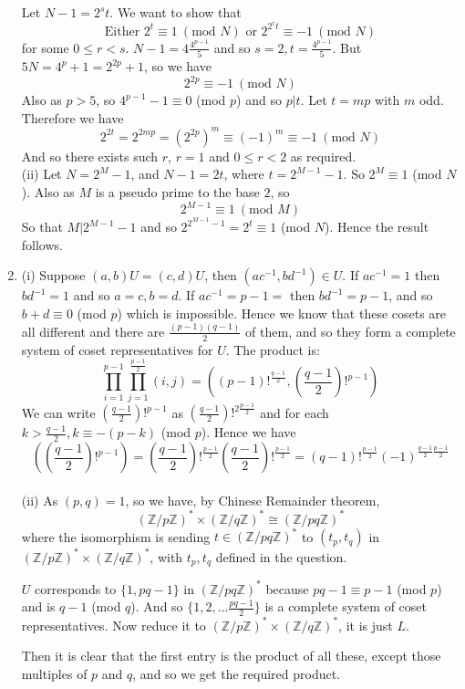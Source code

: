 \begin{enumerate}
    Let $N-1=2^s t$. We want to show that
    $$\text{Either } 2^t \equiv 1~(\text{mod } N) \text{ or } 2^{2^r t} \equiv -1~(\text{mod }N)$$
    for some $0 \le r <s$. $N-1=4 \frac{4^{p-1}}{5}$ and so $s = 2, t= \frac{4^{p-1}}{5}$.
    But $5N=4^p+1=2^{2p}+1$, so we have $$2^{2p} \equiv -1~(\text{mod }N)$$ Also as $p>5$, so
    $4^{p-1}-1 \equiv 0$ (mod $p$) and so $p|t$. Let $t=mp$ with $m$ odd.
    Therefore we have
    $$2^{2t}=2^{2mp}=(2^{2p})^{m} \equiv (-1)^m \equiv -1~(\text{mod } N)$$
    And so there exists such $r$, $r=1$ and $0 \le r < 2$ as required.\\
    (ii) Let $N=2^M-1$, and $N-1=2t$, where $t=2^{M-1}-1$. So $2^M \equiv 1$ (mod $N$).
    Also as $M$ is a pseudo prime to the base $2$, so
    $$2^{M-1} \equiv 1~(\text{mod } M)$$
    So that $M|2^{M-1}-1$ and so $2^{2^{M-1}-1}=2^t \equiv 1$ (mod $N$). Hence the result follows.
\item (i) Suppose $(a,b)U=(c,d)U$, then $(ac^{-1},bd^{-1}) \in U$. If $ac^{-1}=1$ then $bd^{-1}=1$ and so $a=c, b=d$. If $ac^{-1}=p-1=$ then $bd^{-1}=p-1$, and so $b+d \equiv 0$ (mod $p$) which is impossible. Hence we know that these cosets are all different and there are $\frac{(p-1)(q-1)}{2}$ of them, and so they form a complete system of coset representatives for $U$. The product is:
    $$\prod_{i=1}^{p-1} \prod_{j=1}^{\frac{p-1}{2}} (i,j)
    =\left((p-1)!^{\frac{q-1}{2}},(\frac{q-1}{2})!^{p-1}\right)$$
    We can write $(\frac{q-1}{2})!^{p-1}$ as $(\frac{q-1}{2})!^{2\frac{p-1}{2}}$
    and for each $k>\frac{q-1}{2}, k \equiv -(p-k)$ (mod $p$).
    Hence we have
    $$\left((\frac{q-1}{2})!^{p-1}\right)=(\frac{q-1}{2})!^{\frac{p-1}{2}}(\frac{q-1}{2})!^{\frac{p-1}{2}}
    =(q-1)!^{\frac{p-1}{2}}(-1)^{\frac{q-1}{2}\frac{p-1}{2}}$$\\
    (ii) As $(p,q)=1$, so we have, by Chinese Remainder theorem,
    $$(\mathbb{Z}/p\mathbb{Z})^* \times (\mathbb{Z}/q\mathbb{Z})^* \cong (\mathbb{Z}/pq\mathbb{Z})^*$$
    where the isomorphism is sending $t \in (\mathbb{Z}/pq\mathbb{Z})^*$ to
    $(t_p,t_q)$ in $(\mathbb{Z}/p\mathbb{Z})^* \times (\mathbb{Z}/q\mathbb{Z})^*$, with $t_p,t_q$ defined in the question.

    $U$ corresponds to $\{1,pq-1\}$ in
    $(\mathbb{Z}/pq\mathbb{Z})^*$ because $pq-1 \equiv p-1$ (mod $p$) and is $q-1$ (mod $q$). And so $\{1,2,\ldots \frac{pq-1}{2}\}$ is a complete system of coset representatives. Now reduce it to
    $(\mathbb{Z}/p\mathbb{Z})^* \times (\mathbb{Z}/q\mathbb{Z})^*$, it is just $L$.

    Then it is clear that the first entry is the product of all these, except those multiples of $p$ and $q$, and so we get the required product.


\end{enumerate}
